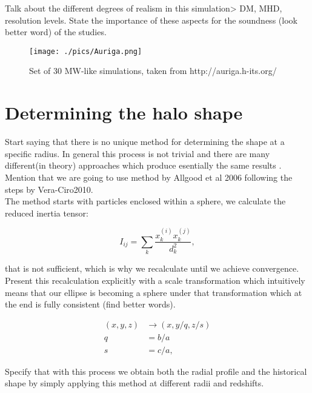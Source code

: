 Talk about the different degrees of realism in this simulation> DM, MHD, resolution levels. State the importance of these aspects for the soundness (look better word) of the studies.\\

\begin{figure}[!ht]
    \centering
    \texttt{[image: ./pics/Auriga.png]}
    \caption{Set of 30 MW-like simulations, taken from http://auriga.h-its.org/}
    \label{fig:auriga}
\end{figure}

\section{Determining the halo shape}
Start saying that there is no unique method for determining the shape at a specific radius. In general this process is not trivial and there are many different(in theory) approaches which produce esentially the same results \cite{Vera-Ciro2010}. Mention that we are going to use method by Allgood et al 2006 \cite{AllGood2006} following the steps by Vera-Ciro2010.\\

The method starts with particles enclosed within a sphere, we calculate the reduced inertia tensor:

\begin{equation}
I_{ij} = \sum_k \frac{x_k^{(i)}x_k^{(j)}}{d^2_k},
\label{eq:inertia}
\end{equation}

that is not sufficient, which is why we recalculate until we achieve convergence. Present this recalculation explicitly with a scale transformation which intuitively means that our ellipse is becoming a sphere under that transformation which at the end is fully consistent (find better words).

\begin{align}
(x,y,z) &\rightarrow (x,y/q,z/s) \label{eq:scale}\\
q &=  b/a \nonumber \\
s &= c/a \nonumber ,
\end{align}

Specify that with this process we obtain both the radial profile and the historical shape by simply applying this method at different radii and redshifts.
